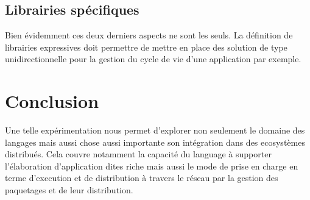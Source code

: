 \documentclass[twoside,a4paper]{article}
\begin{document}
\subsection{Librairies spécifiques}

Bien  évidemment ces  deux derniers  aspects  ne sont  les seuls.   La
définition de librairies expressives doit permettre de mettre en place
des solution de type  unidirectionnelle \cite{unidirectionnal} pour la
gestion du cycle de vie d'une application par exemple.

\section{Conclusion}

Une  telle expérimentation  nous  permet d'explorer  non seulement  le
domaine des langages mais aussi chose aussi importante son intégration
dans des ecosystèmes distribués.  Cela couvre notamment la capacité du
language  à supporter  l'élaboration  d'application  dites riche  mais
aussi  le  mode  de  prise  en  charge  en  terme  d'execution  et  de
distribution à travers  le réseau par la gestion des  paquetages et de
leur distribution.



\end{document}
